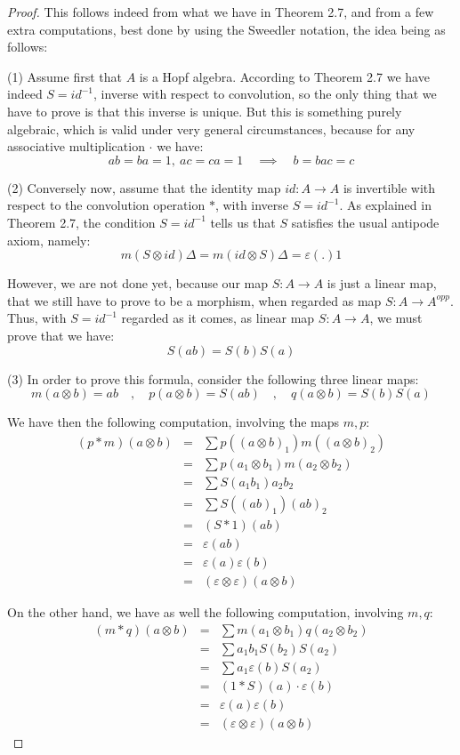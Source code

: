 \documentclass[12pt]{amsbook}
\begin{document}
\begin{proof}
This follows indeed from what we have in Theorem 2.7, and from a few extra computations, best done by using the Sweedler notation, the idea being as follows:

\medskip

(1) Assume first that $A$ is a Hopf algebra. According to Theorem 2.7 we have indeed $S=id^{-1}$, inverse with respect to convolution, so the only thing that we have to prove is that this inverse is unique. But this is something purely algebraic, which is valid under very general circumstances, because for any associative multiplication $\cdot$ we have:
$$ab=ba=1,\ ac=ca=1\quad\implies\quad b=bac=c$$ 

(2) Conversely now, assume that the identity map $id:A\to A$ is invertible with respect to the convolution operation $*$, with inverse $S=id^{-1}$. As explained in Theorem 2.7, the condition $S=id^{-1}$ tells us that $S$ satisfies the usual antipode axiom, namely:
$$m(S\otimes id)\Delta=m(id\otimes S)\Delta=\varepsilon(.)1$$

However, we are not done yet, because our map $S:A\to A$ is just a linear map, that we still have to prove to be a morphism, when regarded as map $S:A\to A^{opp}$. Thus, with $S=id^{-1}$ regarded as it comes, as linear map $S:A\to A$, we must prove that we have:
$$S(ab)=S(b)S(a)$$

(3) In order to prove this formula, consider the following three linear maps:
$$m(a\otimes b)=ab\quad,\quad p(a\otimes b)=S(ab)\quad,\quad q(a\otimes b)=S(b)S(a)$$

We have then the following computation, involving the maps $m,p$:
\begin{eqnarray*}
(p*m)(a\otimes b)
&=&\sum p\left((a\otimes b)_1\right)m\left((a\otimes b)_2\right)\\
&=&\sum p(a_1\otimes b_1)m(a_2\otimes b_2)\\
&=&\sum S(a_1b_1)a_2b_2\\
&=&\sum S\left((ab)_1\right)(ab)_2\\
&=&(S*1)(ab)\\
&=&\varepsilon(ab)\\
&=&\varepsilon(a)\varepsilon(b)\\
&=&(\varepsilon\otimes\varepsilon)(a\otimes b)
\end{eqnarray*}

On the other hand, we have as well the following computation, involving $m,q$:
\begin{eqnarray*}
(m*q)(a\otimes b)
&=&\sum m(a_1\otimes b_1)q(a_2\otimes b_2)\\
&=&\sum a_1b_1S(b_2)S(a_2)\\
&=&\sum a_1\varepsilon(b)S(a_2)\\
&=&(1*S)(a)\cdot\varepsilon(b)\\
&=&\varepsilon(a)\varepsilon(b)\\
&=&(\varepsilon\otimes\varepsilon)(a\otimes b)
\end{eqnarray*}


\end{proof}
\end{document}
